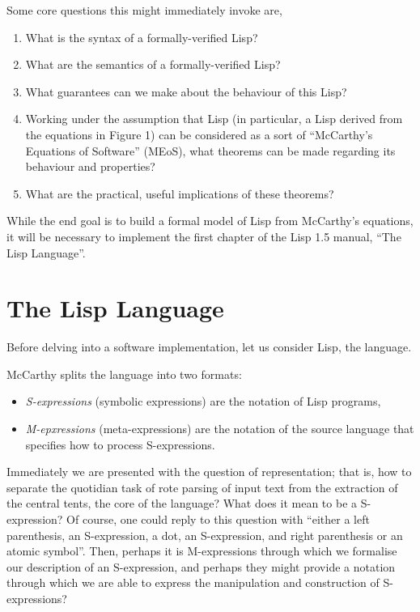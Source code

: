 \documentclass[10pt]{article}
\begin{document}
Some core questions this might immediately invoke are,

\begin{enumerate}
  \item What is the syntax of a formally-verified Lisp?
  \item What are the semantics of a formally-verified Lisp?
  \item What guarantees can we make about the behaviour of this Lisp?
  \item Working under the assumption that Lisp (in particular, a Lisp
    derived from the equations in Figure 1) can be considered as a
    sort of ``McCarthy's Equations of Software'' (MEoS), what theorems
    can be made regarding its behaviour and properties?
  \item What are the practical, useful implications of these theorems?
\end{enumerate}

While the end goal is to build a formal model of Lisp from McCarthy's
equations, it will be necessary to implement the first chapter of the
Lisp 1.5 manual, ``The Lisp Language''.

\section{The Lisp Language}

Before delving into a software implementation, let us consider Lisp,
the language.

McCarthy splits the language into two formats:

\begin{itemize}

\item \emph{S-expressions} (symbolic expressions) are the notation of
  Lisp programs,

\item \emph{M-epxressions} (meta-expressions) are the notation of the
  source language that specifies how to process S-expressions.

\end{itemize}

Immediately we are presented with the question of representation; that
is, how to separate the quotidian task of rote parsing of input text
from the extraction of the central tents, the core of the language?
What does it mean to be a S-expression? Of course, one could reply to
this question with ``either a left parenthesis, an S-expression, a
dot, an S-expression, and right parenthesis or an atomic
symbol''. Then, perhaps it is M-expressions through which we formalise
our description of an S-expression, and perhaps they might provide a
notation through which we are able to express the manipulation and
construction of S-expressions?


\end{document}
